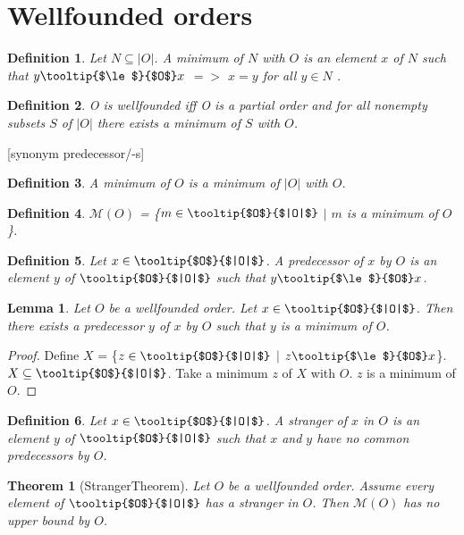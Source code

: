\documentclass{article}
\newcommand{\oO}[1]{\mbox{\tooltip{$\le$}{$#1$}}}
\newcommand{\oBC}[1]{\vert #1 \vert}
\newcommand{\oB}[1]{\mbox{\tooltip{$#1$}{$|#1|$}}}
\newcommand{\Min}[1]{\mathcal{M}(#1)}
\newtheorem*{definition}{Definition}
\newtheorem{lemma}{Lemma}
\newtheorem*{theorem}{Theorem}
\begin{document}
\section{Wellfounded orders}
\begin{forthel}
	\begin{definition}
		Let $N \subseteq \oBC{O}$. 
		A minimum of $N$ with $O$ is an element $x$ of $N$ such that 
		$y \oO{O} x$  $=>$  $x = y$ for all $y \in N$ .
	\end{definition}
	
	\begin{definition}
		O is wellfounded iff O is a partial order and for all nonempty subsets $S$ of $\oBC{O}$
		there exists a minimum of $S$ with $O$.
	\end{definition}
	
	[synonym predecessor/-s]
	\begin{definition}
		A  minimum of $O$ is a minimum of $\oBC{O}$ with $O$.
	\end{definition}
	\begin{definition}
		$\Min{O}$ = \{$m \in \oB{O}$ $|$ $m$ is a  minimum of $O$ \}.
	\end{definition}
	
	\begin{definition}
		Let $x \in \oB{O}$. A predecessor of $x$ by $O$ is an element $y$ of $\oB{O}$ such that $y \oO{O} x$.
	\end{definition}
	
	\begin{lemma}
		Let $O$ be a wellfounded order. Let $x \in \oB{O}$. 
		Then there exists a predecessor $y$ of $x$ by $O$ such that $y$ is a  minimum of $O$.
	\end{lemma}
	\begin{proof}
		Define $X$ = \{$z \in \oB{O}$ $|$ $z \oO{O} x$\}. $X \subseteq \oB{O}$.
		Take a minimum $z$ of $X$ with $O$. $z$ is a  minimum of $O$.
	\end{proof}
	\begin{definition}
		Let $x \in \oB{O}$. A stranger of $x$ in $O$ is an element $y$ of $\oB{O}$ such that 
		$x$ and $y$ have no common predecessors by $O$.
	\end{definition}
	\begin{theorem}[StrangerTheorem]
		Let $O$ be a wellfounded order. Assume every element of $\oB{O}$ has a stranger in $O$.
		Then $\Min{O}$ has no upper bound by $O$.
	\end{theorem}
\end{forthel}
\end{document}
